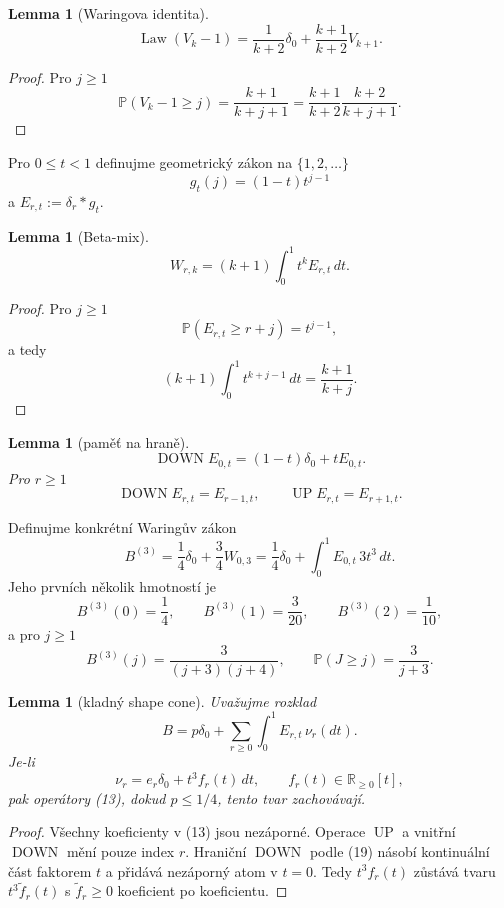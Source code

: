 \documentclass[11pt,a4paper]{article}
\newtheorem{lemma}[theorem]{Lemma}
\theoremstyle{definition}
\theoremstyle{remark}
\theoremstyle{plain}
\newcommand{\Prb}{\mathbb P}
\newcommand{\Law}{\operatorname{Law}}
\newcommand{\DOWN}{\operatorname{DOWN}}
\newcommand{\UP}{\operatorname{UP}}
\begin{document}
\begin{lemma}[Waringova identita]
\[
\boxed{
\Law(V_k-1)
=
\frac1{k+2}\delta_0+
\frac{k+1}{k+2}V_{k+1}.
}
\tag{17}
\]
\end{lemma}

\begin{proof}
Pro $j\ge1$
\[
\Prb(V_k-1\ge j)
=
\frac{k+1}{k+j+1}
=
\frac{k+1}{k+2}\frac{k+2}{k+j+1}.
\]
\end{proof}

Pro $0\le t<1$ definujme geometrický zákon na $\{1,2,\dots\}$
\[
g_t(j)=(1-t)t^{j-1}
\]
a $E_{r,t}:=\delta_r*g_t$.

\begin{lemma}[Beta-mix]
\[
\boxed{
W_{r,k}=(k+1)\int_0^1 t^kE_{r,t}\,dt.
}
\tag{18}
\]
\end{lemma}

\begin{proof}
Pro $j\ge1$
\[
\Prb(E_{r,t}\ge r+j)=t^{j-1},
\]
a tedy
\[
(k+1)\int_0^1 t^{k+j-1}\,dt
=
\frac{k+1}{k+j}.
\]
\end{proof}

\begin{lemma}[paměť na hraně]
\[
\boxed{
\DOWN E_{0,t}=(1-t)\delta_0+tE_{0,t}.
}
\tag{19}
\]
Pro $r\ge1$
\[
\DOWN E_{r,t}=E_{r-1,t},
\qquad
\UP E_{r,t}=E_{r+1,t}.
\]
\end{lemma}

Definujme konkrétní Waringův zákon
\[
B^{(3)}
=
\frac14\delta_0+\frac34W_{0,3}
=
\frac14\delta_0+\int_0^1 E_{0,t}\,3t^3\,dt.
\tag{20}
\]
Jeho prvních několik hmotností je
\[
B^{(3)}(0)=\frac14,\qquad
B^{(3)}(1)=\frac3{20},\qquad
B^{(3)}(2)=\frac1{10},
\]
a pro $j\ge1$
\[
B^{(3)}(j)=\frac{3}{(j+3)(j+4)},
\qquad
\Prb(J\ge j)=\frac3{j+3}.
\tag{21}
\]

\begin{lemma}[kladný shape cone]
Uvažujme rozklad
\[
B=p\delta_0+\sum_{r\ge0}\int_0^1E_{r,t}\,\nu_r(dt).
\]
Je-li
\[
\nu_r=e_r\delta_0+t^3f_r(t)\,dt,
\qquad f_r(t)\in\mathbb R_{\ge0}[t],
\tag{22}
\]
pak operátory (13), dokud $p\le1/4$, tento tvar zachovávají.
\end{lemma}

\begin{proof}
Všechny koeficienty v (13) jsou nezáporné. Operace $\UP$ a vnitřní
$\DOWN$ mění pouze index $r$. Hraniční $\DOWN$ podle (19) násobí
kontinuální část faktorem $t$ a přidává nezáporný atom v $t=0$.
Tedy $t^3f_r(t)$ zůstává tvaru $t^3\widetilde f_r(t)$ s
$\widetilde f_r\ge0$ koeficient po koeficientu.
\end{proof}
\end{document}
